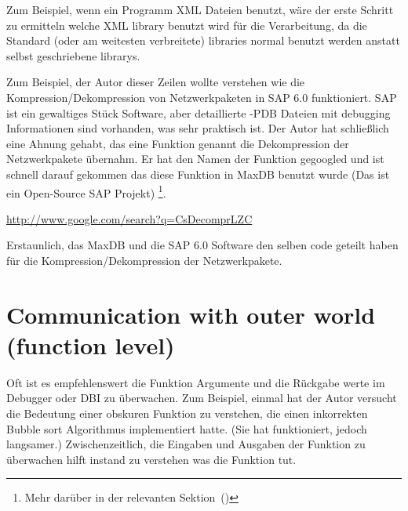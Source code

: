 
Zum Beispiel, wenn ein Programm XML Dateien benutzt, wäre der erste Schritt zu ermitteln welche
XML library benutzt wird für die Verarbeitung, da die Standard (oder am weitesten verbreitete) libraries
normal benutzt werden anstatt selbst geschriebene librarys.


Zum Beispiel, der Autor dieser Zeilen wollte verstehen wie die Kompression/Dekompression von Netzwerkpaketen in SAP 6.0 funktioniert.
SAP ist ein gewaltiges Stück Software, aber detaillierte -\gls{PDB} Dateien mit debugging Informationen sind vorhanden, was sehr praktisch 
ist. Der Autor hat schließlich eine Ahnung gehabt, das eine Funktion genannt  die Dekompression der Netzwerkpakete übernahm.
Er hat den Namen der Funktion gegoogled und ist schnell darauf gekommen das diese Funktion in MaxDB benutzt wurde
(Das ist ein Open-Source SAP Projekt) \footnote{Mehr darüber in der relevanten Sektion~()}. 

\url{http://www.google.com/search?q=CsDecomprLZC}

Erstaunlich, das MaxDB und die SAP 6.0 Software den selben code geteilt haben für die Kompression/Dekompression der Netzwerkpakete.


\section{Communication with outer world (function level)} %
Oft ist es empfehlenswert die Funktion Argumente und die Rückgabe werte im Debugger oder \ac{DBI} zu überwachen.
Zum Beispiel, einmal hat der Autor versucht die Bedeutung einer obskuren Funktion zu verstehen, die einen inkorrekten
Bubble sort Algorithmus implementiert hatte. (Sie hat funktioniert, jedoch langsamer.) 
Zwischenzeitlich, die Eingaben und Ausgaben der Funktion zu überwachen hilft instand zu verstehen was die Funktion tut.









